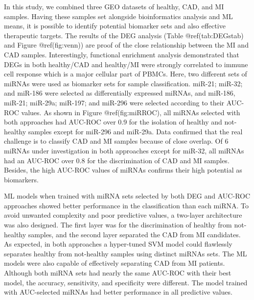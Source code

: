 \documentclass[smallextended]{svjour3}       %
\begin{document}
In this study, we combined three GEO datasets of healthy, CAD, and MI
samples. Having these samples set alongside bioinformatics analysis and
ML means, it is possible to identify potential biomarker sets and also
effective therapeutic targets. The results of the DEG analysis (Table
@ref(tab:DEGstab) and Figure @ref(fig:venn)) are proof of the close
relationship between the MI and CAD samples. Interestingly, functional
enrichment analysis demonstrated that DEGs in both healthy/CAD and
healthy/MI were strongly correlated to immune cell response which is a
major cellular part of PBMCs. Here, two different sets of miRNAs were
used as biomarker sets for sample classification. miR-21; miR-32; and
miR-186 were selected as differentially expressed miRNAs, and miR-186,
miR-21; miR-29a; miR-197; and miR-296 were selected according to their
AUC-ROC values. As shown in Figure @ref(fig:miRROC), all miRNAs selected
with both approaches had AUC-ROC over 0.9 for the isolation of healthy
and not-healthy samples except for miR-296 and miR-29a. Data confirmed
that the real challenge is to classify CAD and MI samples because of
close overlap. Of 6 miRNAs under investigation in both approaches except
for miR-32, all miRNAs had an AUC-ROC over 0.8 for the discrimination of
CAD and MI samples. Besides, the high AUC-ROC values of miRNAs confirms
their high potential as biomarkers.

ML models when trained with miRNA sets selected by both DEG and AUC-ROC
approaches showed better performance in the classification than each
miRNA. To avoid unwanted complexity and poor predictive values, a
two-layer architecture was also designed. The first layer was for the
discrimination of healthy from not-healthy samples, and the second layer
separated the CAD from MI candidates. As expected, in both approaches a
hyper-tuned SVM model could flawlessly separates healthy from
not-healthy samples using distinct miRNAs sets. The ML models were also
capable of effectively separating CAD from MI patients. Although both
miRNA sets had nearly the same AUC-ROC with their best model, the
accuracy, sensitivity, and specificity were different. The model trained
with AUC-selected miRNAs had better performance in all predictive
values.
\end{document}
